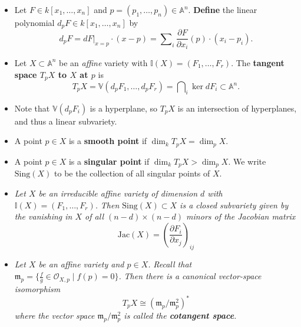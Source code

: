 \documentclass[10pt]{article}
\newcommand{\van}{\mathbb{V}}
\newcommand{\ide}{\mathbb{I}}
\newcommand{\aff}{\mathbb{A}}
\newcommand{\kon}{{k[x_1,\ldots,x_n]}}
\newcommand{\maid}{\mathfrak{m}}
\begin{document}
            \begin{itemize}
                \item Let $F\in\kon$ and $p=(p_1,\ldots,p_n)\in\aff^n$.
                    \textbf{Define} the linear polynomial $d_pF\in\kon$ by
                    \begin{equation*}
                        d_pF = dF|_{x=p} \cdot(x-p) = \sum\nolimits_i\frac{\partial F}{\partial x_i}(p)\cdot (x_i-p_i).
                    \end{equation*}
                \item Let $X\subset\aff^n$ be an \emph{affine} variety with $\ide(X)=(F_1,\ldots,F_r)$.
                    The \textbf{tangent space $T_pX$ to $X$ at $p$} is
                    \begin{equation*}
                        T_pX = \van(d_pF_1,\ldots,d_pF_r) = \bigcap\nolimits_i\ker dF_i\subset\aff^n.
                    \end{equation*}
                \item Note that $\van(d_p F_i)$ is a hyperplane, so $T_pX$ is an intersection of hyperplanes, and thus a linear subvariety.
                \item A point $p\in X$ is a \textbf{smooth point} if $\dim_k T_pX=\dim_p X$.
                \item A point $p\in X$ is a \textbf{singular point} if $\dim_k T_pX>\dim_p X$.
                    We write $\mathrm{Sing}(X)$ to be the collection of all singular points of $X$.
                \item \emph{Let $X$ be an \emph{irreducible} affine variety of dimension $d$ with $\ide(X)=(F_1,\ldots,F_r)$.}
                    \emph{Then $\mathrm{Sing}(X)\subset X$ is a closed subvariety given by the vanishing in $X$ of all $(n-d)\times(n-d)$ minors of the Jacobian matrix}
                    \begin{equation*}
                        \mathrm{Jac}(X) = \left(\frac{\partial F_i}{\partial x_j}\right)_{ij}
                    \end{equation*}
                \item \emph{Let $X$ be an affine variety and $p\in X$.}
                    \emph{Recall that $\maid_p=\{\frac{f}{g}\in\mathcal{O}_{X,p}\mid f(p)=0\}$.}
                    \emph{Then there is a canonical vector-space isomorphism}
                    \begin{equation*}
                        T_pX\cong(\maid_p/\maid_p^2)^*
                    \end{equation*}
                    \emph{where the vector space $\maid_p/\maid_p^2$ is called the \textbf{cotangent space}.}


\end{itemize}
\end{document}
